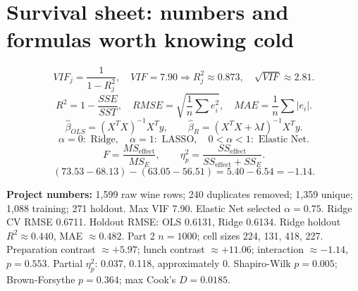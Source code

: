 \documentclass[10.5pt,a4paper]{article}
\begin{document}
\newpage
\section*{Survival sheet: numbers and formulas worth knowing cold}
\begin{tcolorbox}[colback=lightblue,colframe=blue,arc=2mm]
\[
VIF_j=\frac{1}{1-R_j^2},\quad VIF=7.90\Rightarrow R_j^2\approx0.873,\quad \sqrt{VIF}\approx2.81.
\]
\[
R^2=1-\frac{SSE}{SST},\quad RMSE=\sqrt{\frac1n\sum e_i^2},\quad MAE=\frac1n\sum|e_i|.
\]
\[
\hat\beta_{OLS}=(X^TX)^{-1}X^Ty,\qquad \hat\beta_R=(X^TX+\lambda I)^{-1}X^Ty.
\]
\[
\alpha=0:\text{ Ridge},\quad \alpha=1:\text{ LASSO},\quad 0<\alpha<1:\text{ Elastic Net}.
\]
\[
F=\frac{MS_{\text{effect}}}{MS_E},\qquad
\eta_p^2=\frac{SS_{\text{effect}}}{SS_{\text{effect}}+SS_E}.
\]
\[
(73.53-68.13)-(63.05-56.51)=5.40-6.54=-1.14.
\]
\end{tcolorbox}
\begin{tcolorbox}[colback=lightgray,colframe=gray!60,arc=2mm]
\textbf{Project numbers:}
1,599 raw wine rows; 240 duplicates removed; 1,359 unique; 1,088 training; 271 holdout.
Max VIF 7.90. Elastic Net selected \(\alpha=0.75\).
Ridge CV RMSE 0.6711. Holdout RMSE: OLS 0.6131, Ridge 0.6134.
Ridge holdout \(R^2\approx0.440\), MAE \(\approx0.482\).
Part 2 \(n=1000\); cell sizes 224, 131, 418, 227.
Preparation contrast \(\approx+5.97\); lunch contrast \(\approx+11.06\);
interaction \(\approx-1.14\), \(p=0.553\).
Partial \(\eta_p^2\): 0.037, 0.118, approximately 0.
Shapiro-Wilk \(p=0.005\); Brown-Forsythe \(p=0.364\); max Cook's \(D=0.0185\).
\end{tcolorbox}
\end{document}
